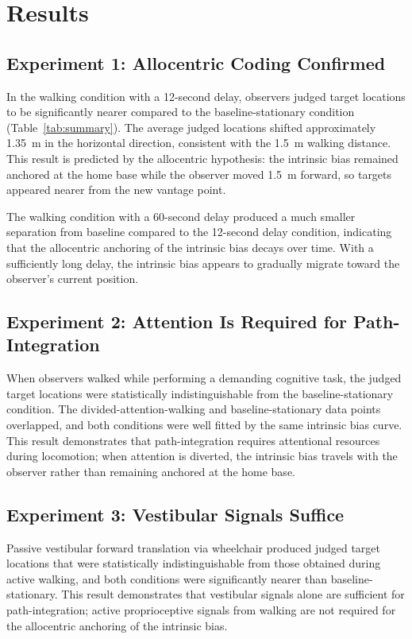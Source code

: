 \documentclass[12pt]{article}
\begin{document}
\section{Results}

\subsection{Experiment 1: Allocentric Coding Confirmed}

In the walking condition with a 12-second delay, observers judged target locations to be significantly nearer compared to the baseline-stationary condition (Table~\ref{tab:summary}). The average judged locations shifted approximately 1.35~m in the horizontal direction, consistent with the 1.5~m walking distance. This result is predicted by the allocentric hypothesis: the intrinsic bias remained anchored at the home base while the observer moved 1.5~m forward, so targets appeared nearer from the new vantage point.

The walking condition with a 60-second delay produced a much smaller separation from baseline compared to the 12-second delay condition, indicating that the allocentric anchoring of the intrinsic bias decays over time. With a sufficiently long delay, the intrinsic bias appears to gradually migrate toward the observer's current position.

\subsection{Experiment 2: Attention Is Required for Path-Integration}

When observers walked while performing a demanding cognitive task, the judged target locations were statistically indistinguishable from the baseline-stationary condition. The divided-attention-walking and baseline-stationary data points overlapped, and both conditions were well fitted by the same intrinsic bias curve. This result demonstrates that path-integration requires attentional resources during locomotion; when attention is diverted, the intrinsic bias travels with the observer rather than remaining anchored at the home base.

\subsection{Experiment 3: Vestibular Signals Suffice}

Passive vestibular forward translation via wheelchair produced judged target locations that were statistically indistinguishable from those obtained during active walking, and both conditions were significantly nearer than baseline-stationary. This result demonstrates that vestibular signals alone are sufficient for path-integration; active proprioceptive signals from walking are not required for the allocentric anchoring of the intrinsic bias.
\end{document}
